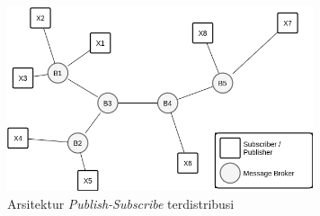 \begin{figure}[h]
	\centering
	\includegraphics[width=9cm]{../../Resources/Images/pub_sub_distributed_ilustration}
	\caption{Arsitektur \textit{Publish-Subscribe} terdistribusi}
	\label{fig:pub_sub_distributed_ilustration}
\end{figure}


